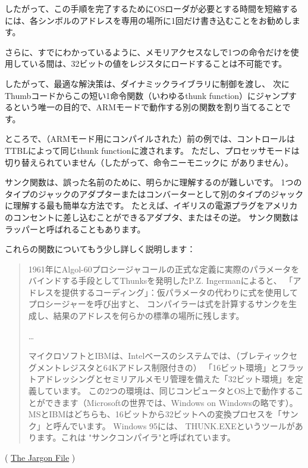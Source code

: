 したがって、この手順を完了するために\ac{OS}ローダが必要とする時間を短縮するには、各シンボルのアドレスを専用の場所に1回だけ書き込むことをお勧めします。

さらに、すでにわかっているように、メモリアクセスなしで1つの命令だけを使用している間は、32ビットの値をレジスタにロードすることは不可能です。

したがって、最適な解決策は、ダイナミックライブラリに制御を渡し、
次にThumbコードからこの短い1命令関数（いわゆる\gls{thunk function}）にジャンプするという唯一の目的で、ARMモードで動作する別の関数を割り当てることです。

ところで、（ARMモード用にコンパイルされた）前の例では、コントロールは\\TT{BL}によって同じ\gls{thunk function}に渡されます。
ただし、プロセッサモードは切り替えられていません（したがって、命令ニーモニックに がありません）。


サンク関数は、誤った名前のために、明らかに理解するのが難しいです。 
1つのタイプのジャックのアダプターまたはコンバーターとして別のタイプのジャックに理解する最も簡単な方法です。 
たとえば、イギリスの電源プラグをアメリカのコンセントに差し込むことができるアダプタ、またはその逆。 
サンク関数はラッパーと呼ばれることもあります。

これらの関数についてもう少し詳しく説明します：

\begin{framed}
\begin{quotation}
1961年にAlgol-60プロシージャコールの正式な定義に実際のパラメータをバインドする手段としてThunksを発明したP.Z. Ingermanによると、
「アドレスを提供するコーディング」：仮パラメータの代わりに式を使用してプロシージャーを呼び出すと、
コンパイラーは式を計算するサンクを生成し、結果のアドレスを何らかの標準の場所に残します。

\dots

マイクロソフトとIBMは、Intelベースのシステムでは、（ブレティックセグメントレジスタと64Kアドレス制限付きの）
「16ビット環境」とフラットアドレッシングとセミリアルメモリ管理を備えた「32ビット環境」を定義しています。
この2つの環境は、同じコンピュータとOS上で動作することができます（Microsoftの世界では、Windows on Windowsの略です）。 
MSとIBMはどちらも、16ビットから32ビットへの変換プロセスを「サンク」と呼んでいます。 
Windows 95には、 THUNK.EXEというツールがあります。これは "サンクコンパイラ"と呼ばれています。
\end{quotation}
\end{framed}
( \href{http://go.yurichev.com/17362}{The Jargon File} )

